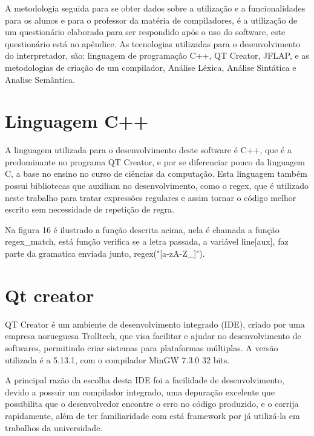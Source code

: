 \documentclass[12pt,oneside,a4paper,chapter=TITLE,section=TITLE,sumario=tradicional]{abntex2}
\begin{document}
A metodologia seguida para se obter dados sobre a utilização e a funcionalidades para os alunos e para o professor da matéria de compiladores, é a utilização de um questionário elaborado para ser respondido após o uso do software, este questionário está no apêndice.
As tecnologias utilizadas para o desenvolvimento do interpretador, são: linguagem de programação C++, QT Creator, JFLAP, e as metodologias de criação de um compilador, Análise Léxica, Análise Sintática e Analise Semântica.  

\section{ Linguagem C++}
\label{sec:linugagemc++}

A linguagem utilizada para o desenvolvimento deste software é C++, que é a predominante no programa QT Creator, e por se diferenciar pouco da linguagem C, a base no ensino no curso de ciências da computação. Esta linguagem também possui bibliotecas que auxiliam no desenvolvimento, como o regex, que é utilizado neste trabalho para tratar expressões regulares e assim tornar o código melhor escrito sem necessidade de repetição de regra.

Na figura 16 é ilustrado a função descrita acima, nela é chamada a função regex\_match, está função verifica se a letra passada, a variável line[aux], faz parte da gramatica enviada junto, regex("[a-zA-Z\_]").

\begin{figure}[htb]
\end{figure} 

\section{ Qt creator}
\label{sec:qtcreator}

QT Creator é um ambiente de desenvolvimento integrado (IDE), criado por uma empresa norueguesa Trolltech, que visa facilitar e ajudar no desenvolvimento de softwares, permitindo criar sistemas para plataformas múltiplas. A versão utilizada é a 5.13.1, com o compilador MinGW 7.3.0 32 bits. 

A principal razão da escolha desta IDE foi a facilidade de desenvolvimento, devido a possuir um compilador integrado, uma depuração excelente que possibilita que o desenvolvedor encontre o erro no código produzido, e o corrija rapidamente, além de ter familiaridade com está framework por já utilizá-la em trabalhos da universidade. 
\end{document}
